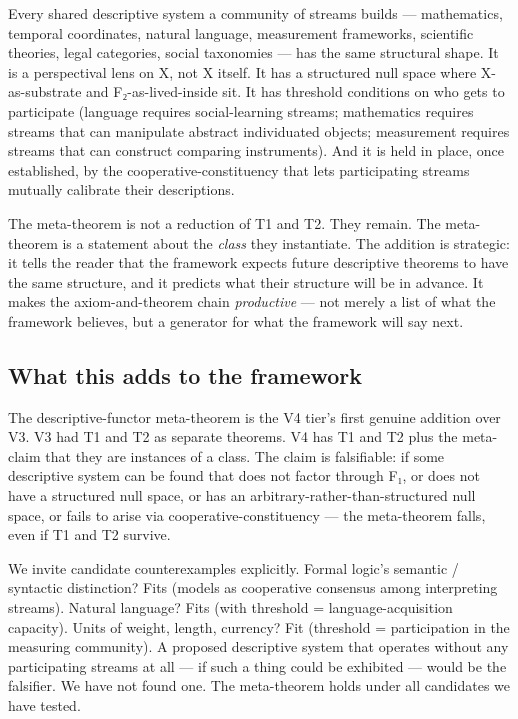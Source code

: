 \documentclass[11pt, openany]{book}
\begin{document}
Every shared descriptive system a community of streams builds --- mathematics, temporal coordinates, natural language, measurement frameworks, scientific theories, legal categories, social taxonomies --- has the same structural shape. It is a perspectival lens on X, not X itself. It has a structured null space where X-as-substrate and F₂-as-lived-inside sit. It has threshold conditions on who gets to participate (language requires social-learning streams; mathematics requires streams that can manipulate abstract individuated objects; measurement requires streams that can construct comparing instruments). And it is held in place, once established, by the cooperative-constituency that lets participating streams mutually calibrate their descriptions.

The meta-theorem is not a reduction of T1 and T2. They remain. The meta-theorem is a statement about the \textit{class} they instantiate. The addition is strategic: it tells the reader that the framework expects future descriptive theorems to have the same structure, and it predicts what their structure will be in advance. It makes the axiom-and-theorem chain \textit{productive} --- not merely a list of what the framework believes, but a generator for what the framework will say next.

\subsection{What this adds to the framework}

The descriptive-functor meta-theorem is the V4 tier's first genuine addition over V3. V3 had T1 and T2 as separate theorems. V4 has T1 and T2 plus the meta-claim that they are instances of a class. The claim is falsifiable: if some descriptive system can be found that does not factor through F₁, or does not have a structured null space, or has an arbitrary-rather-than-structured null space, or fails to arise via cooperative-constituency --- the meta-theorem falls, even if T1 and T2 survive.

We invite candidate counterexamples explicitly. Formal logic's semantic / syntactic distinction? Fits (models as cooperative consensus among interpreting streams). Natural language? Fits (with threshold = language-acquisition capacity). Units of weight, length, currency? Fit (threshold = participation in the measuring community). A proposed descriptive system that operates without any participating streams at all --- if such a thing could be exhibited --- would be the falsifier. We have not found one. The meta-theorem holds under all candidates we have tested.
\end{document}
